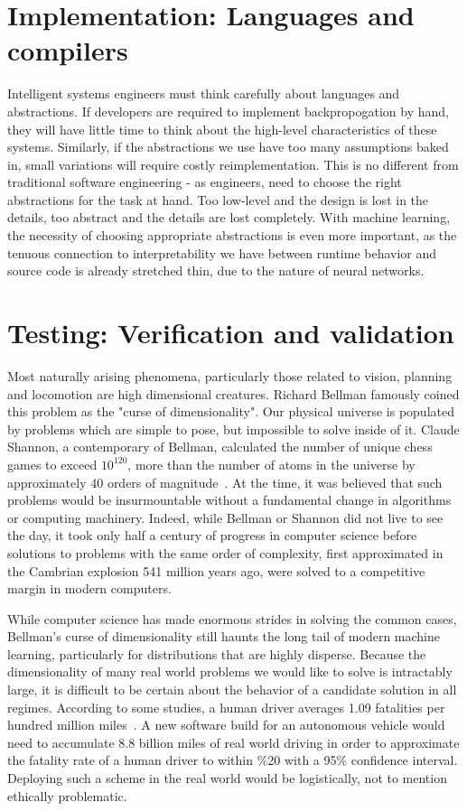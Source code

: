 \documentclass[12pt,initial,twoside,maitrise]{dms}
\numberwithin{equation}{section}
\numberwithin{table}{chapter}
\numberwithin{figure}{chapter}
\begin{document}
\section{Implementation: Languages and compilers}

Intelligent systems engineers must think carefully about languages and abstractions. If developers are required to implement backpropogation by hand, they will have little time to think about the high-level characteristics of these systems. Similarly, if the abstractions we use have too many assumptions baked in, small variations will require costly reimplementation. This is no different from traditional software engineering - as engineers, need to choose the right abstractions for the task at hand. Too low-level and the design is lost in the details, too abstract and the details are lost completely. With machine learning, the necessity of choosing appropriate abstractions is even more important, as the tenuous connection to interpretability we have between runtime behavior and source code is already stretched thin, due to the nature of neural networks.

\section{Testing: Verification and validation}

Most naturally arising phenomena, particularly those related to vision, planning and locomotion are high dimensional creatures. Richard Bellman famously coined this problem as the "curse of dimensionality". Our physical universe is populated by problems which are simple to pose, but impossible to solve inside of it. Claude Shannon, a contemporary of Bellman, calculated the number of unique chess games to exceed $10^{120}$, more than the number of atoms in the universe by approximately 40 orders of magnitude~\cite{shannon1950xxii}. At the time, it was believed that such problems would be insurmountable without a fundamental change in algorithms or computing machinery. Indeed, while Bellman or Shannon did not live to see the day, it took only half a century of progress in computer science before solutions to problems with the same order of complexity, first approximated in the Cambrian explosion 541 million years ago, were solved to a competitive margin in modern computers.

While computer science has made enormous strides in solving the common cases, Bellman's curse of dimensionality still haunts the long tail of modern machine learning, particularly for distributions that are highly disperse. Because the dimensionality of many real world problems we would like to solve is intractably large, it is difficult to be certain about the behavior of a candidate solution in all regimes. According to some studies, a human driver averages 1.09 fatalities per hundred million miles~\cite{kalra2016driving}. A new software build for an autonomous vehicle would need to accumulate 8.8 billion miles of real world driving in order to approximate the fatality rate of a human driver to within \%20 with a 95\% confidence interval. Deploying such a scheme in the real world would be logistically, not to mention ethically problematic.
\end{document}
